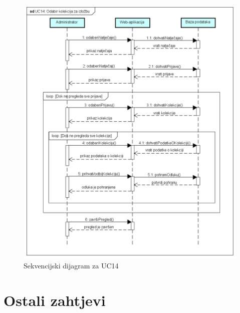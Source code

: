 		\begin{figure}[H]
			
			\includegraphics[width=\textwidth,height=\textheight,keepaspectratio]{sd_uc14}
			\caption{Sekvencijski dijagram za UC14}
			
		\end{figure}
		\eject
	
		\section{Ostali zahtjevi}
		
